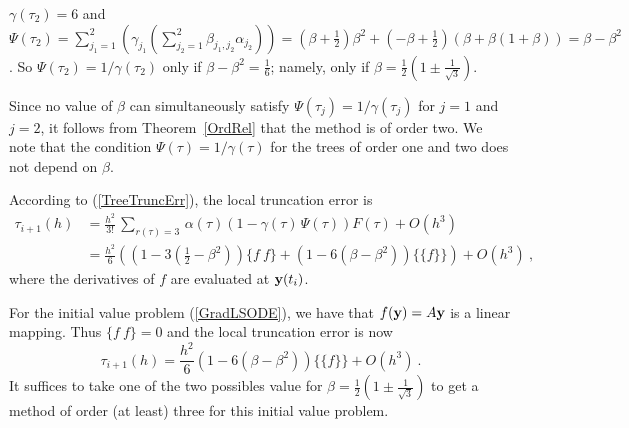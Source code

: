 {{\begin{enumerate}
$\gamma(\tau_2) = 6$ and
$\displaystyle 
\Psi(\tau_2) = \sum_{j_1=1}^2 \left( \gamma_{j_1}
 \left( \sum_{j_2=1}^2 \beta_{j_1,j_2} \alpha_{j_2}\right)\right)
= \left(\beta + \frac{1}{2}\right)\beta^2
+ \left(-\beta + \frac{1}{2}\right)\left( \beta +\beta (1+\beta) \right)
= \beta - \beta^2$.
So $\Psi(\tau_2) = 1/\gamma(\tau_2)$ only if
$\displaystyle \beta - \beta^2 = \frac{1}{6}$; namely, only if
$\displaystyle \beta = \frac{1}{2} \left(1 \pm \frac{1}{\sqrt{3}}\right)$.
\end{enumerate}
}

Since no value of $\beta$ can simultaneously satisfy
$\Psi(\tau_j) = 1/\gamma(\tau_j)$ for $j=1$ and $j=2$, it follows from
Theorem~\ref{OrdRel} that the method is of order two.   We note that
the condition $\Psi(\tau) = 1/\gamma(\tau)$ for the trees of order one
and two does not depend on $\beta$.

 According to (\ref{TreeTruncErr}), the local truncation error
is
\begin{align*}
\tau_{i+1}(h) &= \frac{h^2}{3!}\,\sum_{r(\tau)=3}\,\alpha(\tau) \left( 1
  -\gamma(\tau)\,\Psi(\tau) \right)F(\tau) + O(h^3) \\
& = \frac{h^2}{6} \left( \left( 1 - 3 \left(\frac{1}{2} - \beta^2\right)\right)
\{ f\ f\} + \left(1  - 6 (\beta - \beta^2)\right)\{\{f\}\}\right) +O(h^3) \ ,
\end{align*}
where the derivatives of $f$ are evaluated at $\mathbf{y}(t_i)$.

 For the initial value problem (\ref{GradLSODE}), we have that
$f(\mathbf{y}) = A\mathbf{y}$ is a linear mapping.  Thus $\{f \ f\} = 0$ and
the local truncation error is now
\[
  \tau_{i+1}(h) = \frac{h^2}{6}
  \left(1  - 6 (\beta - \beta^2)\right)\{\{f\}\} +O(h^3) \ .
\]
It suffices to take one of the two possibles value for
$\displaystyle \beta = \frac{1}{2} \left(1 \pm \frac{1}{\sqrt{3}}\right)$
to get a method of order (at least) three for this initial value problem.

}
